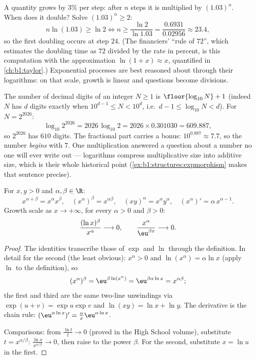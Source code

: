 \begin{example}\label{ex:b1:functions:doubling}
A quantity grows by $3\%$ per step: after $n$ steps it is
multiplied by $(1.03)^n$. When does it double? Solve $(1.03)^n
\geq 2$:
\[
n\ln(1.03) \geq \ln2
\iff n \geq \frac{\ln 2}{\ln 1.03}
= \frac{0.6931}{0.02956} \approx 23.4 ,
\]
so the first doubling occurs at step $24$. (The financiers'
``rule of $72$'', which estimates the doubling time as
$72$ divided by the rate in percent, is this computation with
the approximation $\ln(1 + x) \approx x$, quantified in
\cref{ch:b1:taylor}.) Exponential
processes are best reasoned about through their logarithms: on
that scale, growth is linear and questions become divisions.
\end{example}

\begin{example}\label{ex:b1:functions:digits}
The number of decimal digits of an integer $N \geq 1$ is
$\floor{\log_{10} N} + 1$ (indeed $N$ has $d$ digits exactly when
$10^{d-1} \leq N < 10^d$, i.e.\ $d - 1 \leq \log_{10}N < d$). For
$N = 2^{2026}$:
\[
\log_{10} 2^{2026} = 2026\,\log_{10}2
= 2026 \times 0.301030 = 609.887 ,
\]
so $2^{2026}$ has $610$ digits. The fractional part carries a
bonus: $10^{0.887} \approx 7.7$, so the number \emph{begins} with
$7$. One multiplication answered a question about a number no one
will ever write out --- logarithms compress multiplicative size
into additive size, which is their whole historical point
(\cref{ex:b1:structures:expmorphism} makes that sentence precise).
\end{example}

\begin{proposition}\label{prop:b1:functions:powerrules}
For $x, y > 0$ and $\alpha, \beta \in \R$:
\[
x^{\alpha+\beta} = x^\alpha x^\beta, \quad
(x^\alpha)^\beta = x^{\alpha\beta}, \quad
(xy)^\alpha = x^\alpha y^\alpha, \quad
(x^\alpha)' = \alpha\, x^{\alpha - 1}.
\]
Growth scale as $x \to +\infty$, for every
$\alpha > 0$ and $\beta > 0$:
\[
\frac{(\ln x)^\beta}{x^\alpha} \longrightarrow 0,
\qquad
\frac{x^\alpha}{\eu^{\beta x}} \longrightarrow 0 .
\]
\end{proposition}

\begin{proof}
The identities transcribe those of $\exp$ and $\ln$ through the
definition. In detail for the second (the least obvious): $x^\alpha
> 0$ and $\ln(x^\alpha) = \alpha\ln x$ (apply $\ln$ to the
definition), so
\[
(x^\alpha)^\beta = \eu^{\beta\ln(x^\alpha)}
= \eu^{\beta\alpha\ln x} = x^{\alpha\beta} ;
\]
the first and third are the same two-line unwindings via
$\exp(u + v) = \exp u\exp v$ and $\ln(xy) = \ln x + \ln y$. The
derivative is the chain rule: $(\eu^{\alpha\ln x})' =
\frac{\alpha}{x} \eu^{\alpha\ln x}$.

Comparisons: from $\frac{\ln t}{t} \to 0$ (proved in the High
School volume), substitute $t = x^{\alpha/\beta}$:
$\frac{\ln x}{x^{\alpha/\beta}} \to 0$, then raise to the power
$\beta$. For the second, substitute $x = \ln u$ in the first.
\end{proof}

